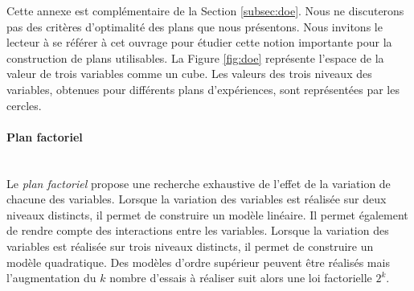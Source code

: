 \bigskip

Cette annexe est complémentaire de la Section \ref{subsec:doe}.
Nous ne discuterons pas des critères d'optimalité des plans que nous présentons. Nous invitons le lecteur à se référer à cet ouvrage pour étudier cette notion importante pour la construction de plans utilisables.
La Figure \ref{fig:doe} représente l'espace de la valeur de trois variables comme un cube.
Les valeurs des trois niveaux des variables, obtenues pour différents plans d'expériences, sont représentées par les cercles.

\paragraph{Plan factoriel}\mbox{\label{parag:doe_factorial}} \\
Le \textit{plan factoriel} propose une recherche exhaustive de l'effet de la variation de chacune des variables.
Lorsque la variation des variables est réalisée sur deux niveaux distincts, il permet de construire un modèle linéaire.
Il permet également de rendre compte des interactions entre les variables.
Lorsque la variation des variables est réalisée sur trois niveaux distincts, il permet de construire un modèle quadratique.
Des modèles d'ordre supérieur peuvent être réalisés mais l'augmentation du $k$ nombre d'essais à réaliser suit alors une loi factorielle $2^k$.

